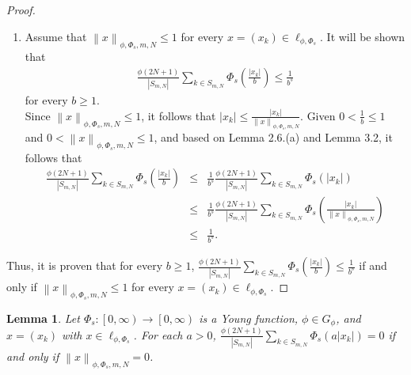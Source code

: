 \documentclass[12pt,a4paper]{article}
\newtheorem{lemma}[definition]{Lemma}
\theoremstyle{remark}
\begin{document}
\begin{proof}
\begin{enumerate}
        \item[($\Rightarrow$)] Assume that $\left\lVert x \right\rVert_{\phi,\Phi_s,m,N} \leq 1$ for every $x = \left(x_k\right) \in \ell_{\phi,\Phi_s}$. It will be shown that 
        \begin{eqnarray*}
            \frac{\phi\left(2N+1\right)}{\left|S_{m,N}\right|} \sum_{k \in S_{m,N}} \Phi_s\left(\frac{\left|x_k\right|}{b}\right) \leq \frac{1}{b^s}
        \end{eqnarray*}
        for every $b \geq 1$.\\
        Since $\left\lVert x \right\rVert_{\phi,\Phi_s,m,N} \leq 1$, it follows that $\left|x_k\right| \leq \frac{\left|x_k\right|}{\left\lVert x \right\rVert_{\phi,\Phi_s,m,N}}$. Given $0 < \frac{1}{b} \leq 1$ and $0 < \left\lVert x \right\rVert_{\phi,\Phi_s,m,N} \leq 1$, and based on Lemma 2.6.(a) and Lemma 3.2, it follows that 
        \begin{eqnarray*}
            \frac{\phi\left(2N+1\right)}{\left|S_{m,N}\right|} \sum_{k \in S_{m,N}} \Phi_s\left(\frac{\left|x_k\right|}{b}\right) &\leq& \frac{1}{b^s} \frac{\phi\left(2N+1\right)}{\left|S_{m,N}\right|} \sum_{k \in S_{m,N}} \Phi_s\left(\left|x_k\right|\right) \\   &\leq& \frac{1}{b^s} \frac{\phi\left(2N+1\right)}{\left|S_{m,N}\right|} \sum_{k \in S_{m,N}} \Phi_s\left(\frac{\left|x_k\right|}{\left\lVert x \right\rVert_{\phi,\Phi_s,m,N}}\right) \\
            &\leq& \frac{1}{b^s}.
        \end{eqnarray*}
    \end{enumerate}
     Thus, it is proven that for every $b \geq 1$, $\frac{\phi\left(2N+1\right)}{\left|S_{m,N}\right|} \sum_{k \in S_{m,N}} \Phi_s\left(\frac{\left|x_k\right|}{b}\right) \leq \frac{1}{b^s}$ if and only if $\left\lVert x \right\rVert_{\phi,\Phi_s,m,N} \leq 1$ for every $x = \left(x_k\right) \in \ell_{\phi,\Phi_s}$.
\end{proof}

\begin{lemma}
    Let $\Phi_s : \left[0, \infty\right) \rightarrow \left[0, \infty\right)$ is a Young function,  $\phi\in G_\phi$, and $x=\left(x_k\right)$ with $x\in\ell_{\phi,\Phi_s}$. For each $a>0$, $\frac{\phi\left(2N+1\right)}{\left|S_{m,N}\right|}\sum_{k\in S_{m,N}}\Phi_s\left(a\left|x_k\right|\right)=0$ if and only if $\left\lVert x\right\rVert _{\phi,\Phi_s,m,N}=0$.
\end{lemma}
\end{document}
